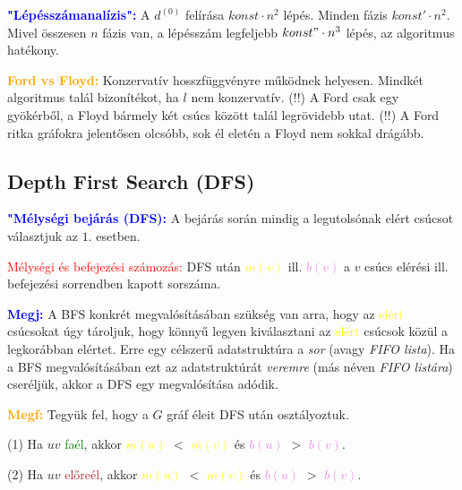 \documentclass[../szamtud.tex]{subfiles}
\begin{document}
        \textcolor{blue}{\textbf{"Lépésszámanalízis":}} A $d^{(0)}$ felírása $konst \cdot n^2$ lépés. Minden fázis $konst' \cdot n^2$. Mivel összesen $n$ fázis van, a lépésszám legfeljebb $konst" \cdot n^3$ lépés, az algoritmus hatékony.

        \textcolor{orange}{\textbf{Ford vs Floyd:}} Konzervatív hosszfüggvényre működnek helyesen. Mindkét algoritmus talál bizonítékot, ha $l$ nem konzervatív. (!!) A Ford csak egy gyökérből, a Floyd bármely két csúcs között talál legrövidebb utat. (!!) A Ford ritka gráfokra jelentősen olcsóbb, sok él eletén a Floyd nem sokkal drágább.

    \subsection{Depth First Search (DFS)}

        \textcolor{blue}{\textbf{"Mélységi bejárás (DFS):}} A bejárás során mindig a legutolsónak elért csúcsot választjuk az $\boxed{1.}$ esetben.

        \textcolor{red}{Mélységi és befejezési számozás:} DFS után \textcolor{yellow}{$m(v)$} ill. \textcolor{violet}{$b(v)$} a $v$ csúcs elérési ill. befejezési sorrendben kapott sorszáma.

        \textcolor{blue}{\textbf{Megj:}} A BFS konkrét megvalósításában szükség van arra, hogy az \textcolor{yellow}{elért} csúcsokat úgy tároljuk, hogy könnyű legyen kiválasztani az \textcolor{yellow}{elért} csúcsok közül a legkorábban elértet. Erre egy célszerű adatstruktúra a \textit{sor} (avagy \textit{FIFO lista}). Ha a BFS megvalósításában ezt az adatstruktúrát \textit{veremre} (más néven \textit{FIFO listára}) cseréljük, akkor a DFS egy megvalósítása adódik.

        \textcolor{orange}{\textbf{Megf:}} Tegyük fel, hogy a $G$ gráf éleit DFS után osztályoztuk. 
        
        (1) Ha $uv$ \textcolor{green}{faél}, akkor \textcolor{yellow}{$m(u)$} $<$ \textcolor{yellow}{$m(v)$} és \textcolor{violet}{$b(u)$} $>$ \textcolor{violet}{$b(v)$}.


        (2) Ha $uv$ \textcolor{brown}{előreél}, akkor \textcolor{yellow}{$m(u)$} $<$ \textcolor{yellow}{$m(v)$} és \textcolor{violet}{$b(u)$} $>$ \textcolor{violet}{$b(v)$}.
\end{document}
